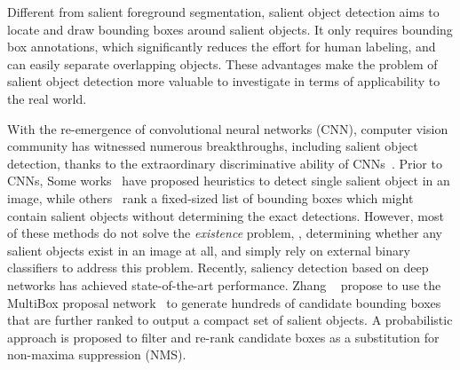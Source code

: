 \documentclass[10pt,twocolumn,letterpaper]{article}
\begin{document}
Different from salient foreground segmentation, salient object detection aims to locate and draw bounding boxes around salient objects. It only requires bounding box annotations, which significantly reduces the effort for human labeling, and can easily separate overlapping objects. {These advantages make the problem of salient object detection more valuable to investigate in terms of applicability to the real world.}

With the re-emergence of convolutional neural networks (CNN), computer vision community has witnessed numerous breakthroughs, including salient object detection, thanks to the extraordinary discriminative ability of CNNs~\cite{zhang2015SOD}. 
Prior to CNNs, Some works~\cite{luo2010saliency,suh2003automatic,valenti2009image,DBLP:conf/cvpr/WangWZFZL12} have proposed heuristics to detect single salient object in an image, while others~\cite{feng2011salient,siva2013looking} rank a fixed-sized list of bounding boxes which might contain salient objects without determining the exact detections. However, most of these methods do not solve the \textit{existence} problem, \ie, determining whether any salient objects exist in an image at all, and simply rely on external binary classifiers to address this problem.
Recently, saliency detection based on deep networks has achieved state-of-the-art performance. Zhang \etal~\cite{zhang2015SOD} propose to use the MultiBox proposal network~\cite{DBLP:conf/cvpr/ErhanSTA14} to generate hundreds of candidate bounding boxes that are further ranked to output a compact set of salient objects. A probabilistic approach is proposed to filter and re-rank candidate boxes as a substitution for non-maxima suppression (NMS). 
%
\end{document}
